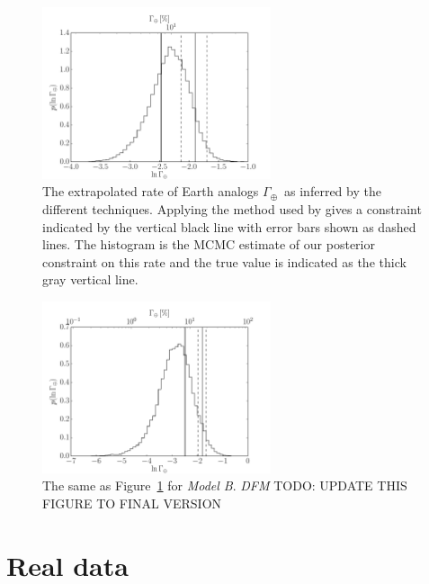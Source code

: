 \documentclass[12pt,preprint]{aastex}
\newcommand{\Fig}[1]{Figure~\ref{fig:#1}}
\newcommand{\fig}[1]{\Fig{#1}}
\newcommand{\figlabel}[1]{\label{fig:#1}}
\newcommand{\todo}[3]{{\color{#2} \emph{#1} TODO: #3}}
\newcommand{\dfmtodo}[1]{\todo{DFM}{red}{#1}}
\newcommand{\rate}{\ensuremath{\Gamma}}
\newcommand{\modelb}{\emph{Model B}}
\newcommand{\gammaearth}{{\ensuremath{\rate_\oplus}}}
\begin{document}
\begin{figure}[p]
\begin{center}
\includegraphics[width=0.6\textwidth]{figures/smooth/rate.pdf}
\end{center}
\caption{%
The extrapolated rate of Earth analogs \gammaearth\ as inferred by the
different techniques.
Applying the method used by \citet{petigura} gives a constraint indicated by
the vertical black line with error bars shown as dashed lines.
The histogram is the MCMC estimate of our posterior constraint on this rate
and the true value is indicated as the thick gray vertical line.
\figlabel{smooth-rate}}
\end{figure}

\begin{figure}[p]
\begin{center}
\includegraphics[width=0.6\textwidth]{figures/simulation/rate.pdf}
\end{center}
\caption{%
The same as \fig{smooth-rate} for \modelb.
\dfmtodo{UPDATE THIS FIGURE TO FINAL VERSION}
\figlabel{simulation-rate}}
\end{figure}

\section{Real data}
\end{document}
